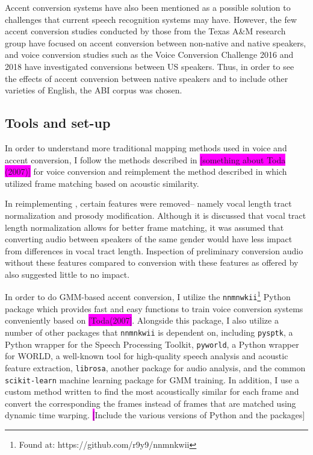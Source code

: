 \documentclass
[
    a4paper,
    twoside,
    12pt,
]
{report}
\begin{document}
Accent conversion systems have also been mentioned as a possible
solution to challenges that current speech recognition systems may have.
However, the few accent conversion studies conducted by those from the
Texas A\&M research group have focused on accent conversion between
non-native and native speakers, and voice conversion studies such as the
Voice Conversion Challenge 2016 and 2018 have investigated conversions
between US speakers. Thus, in order to see the effects of accent
conversion between native speakers and to include other varieties of
English, the ABI corpus was chosen.

\hypertarget{tools-and-set-up}{%
\subsection{Tools and set-up}\label{tools-and-set-up}}

In order to understand more traditional mapping methods used in voice
and accent conversion, I follow the methods described in
\colorbox{magenta}{[something about Toda (2007)]} for voice conversion
and reimplement the method described in \textcite{aryal2014} which
utilized frame matching based on acoustic similarity.

In reimplementing \textcite{aryal2014}, certain features were removed--
namely vocal length tract normalization and prosody modification.
Although it is discussed that vocal tract length normalization allows
for better frame matching, it was assumed that converting audio between
speakers of the same gender would have less impact from differences in
vocal tract length. Inspection of preliminary conversion audio without
these features compared to conversion with these features as offered by
\textcite{zhao2018a} also suggested little to no impact.

In order to do GMM-based accent conversion, I utilize the
\texttt{nnmnwkii}\footnote{Found at: https://github.com/r9y9/nnmnkwii}
Python package which provides fast and easy functions to train voice
conversion systems conveniently based on
\colorbox{magenta}{[Toda(2007]}. Alongside this package, I also utilize
a number of other packages that \texttt{nnmnkwii} is dependent on,
including \texttt{pysptk}, a Python wrapper for the Speech Processing
Toolkit, \texttt{pyworld}, a Python wrapper for WORLD, a well-known tool
for high-quality speech analysis and acoustic feature extraction,
\texttt{librosa}, another package for audio analysis, and the common
\texttt{scikit-learn} machine learning package for GMM training. In
addition, I use a custom method written to find the most acoustically
similar for each frame and convert the corresponding the frames instead
of frames that are matched using dynamic time warping.
\colorbox{magenta}[Include the various versions of Python and the
packages{]}
\cleardoublepage
\end{document}
